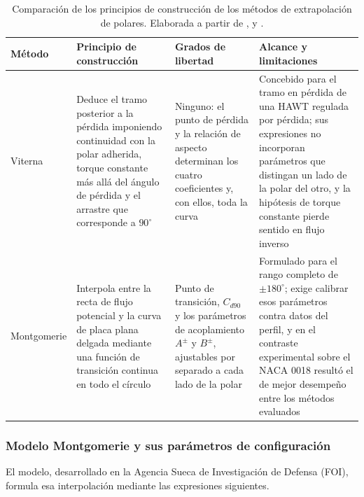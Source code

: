 \begin{table}[H]
    \centering
    \caption[Comparación de los métodos de extrapolación de polares.]{Comparación de los principios de construcción de los métodos de extrapolación de polares. Elaborada a partir de \textcite{viterna1982theoretical}, \textcite{montgomerie2004methods} y \textcite{Bianchini2015}.}
    \label{tab:extrapolacion_metodos}
    \renewcommand{\arraystretch}{1.2}
    \footnotesize
    \begin{tabular}{p{2.1cm} p{4.0cm} p{3.2cm} p{4.2cm}}
        \hline
        \textbf{Método} & \textbf{Principio de construcción} & \textbf{Grados de libertad} & \textbf{Alcance y limitaciones} \\
        \hline
        Viterna &
        Deduce el tramo posterior a la pérdida imponiendo continuidad con la polar adherida, torque constante más allá del ángulo de pérdida y el arrastre que corresponde a $90^\circ$~\parencite{viterna1982theoretical} &
        Ninguno: el punto de pérdida y la relación de aspecto determinan los cuatro coeficientes y, con ellos, toda la curva &
        Concebido para el tramo en pérdida de una HAWT regulada por pérdida; sus expresiones no incorporan parámetros que distingan un lado de la polar del otro, y la hipótesis de torque constante pierde sentido en flujo inverso \\
        Montgomerie &
        Interpola entre la recta de flujo potencial y la curva de placa plana delgada mediante una función de transición continua en todo el círculo~\parencite{montgomerie2004methods} &
        Punto de transición, $C_{d90}$ y los parámetros de acoplamiento $A^{\pm}$ y $B^{\pm}$, ajustables por separado a cada lado de la polar &
        Formulado para el rango completo de $\pm 180^\circ$; exige calibrar esos parámetros contra datos del perfil, y en el contraste experimental sobre el NACA 0018 resultó el de mejor desempeño entre los métodos evaluados~\parencite{Bianchini2015} \\
        \hline
    \end{tabular}
\end{table}

\subsubsection{Modelo Montgomerie y sus parámetros de configuración}

El modelo, desarrollado en la Agencia Sueca de Investigación de Defensa (FOI), formula esa interpolación mediante las expresiones siguientes.

